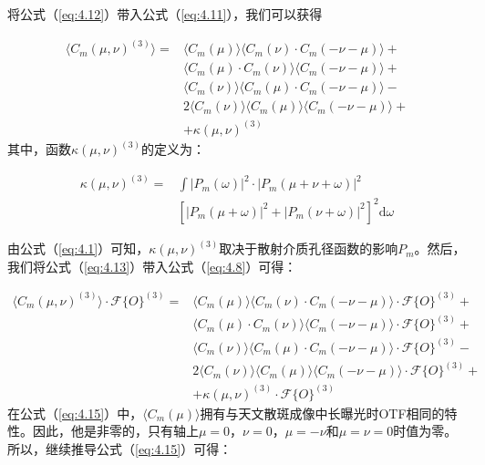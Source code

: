 将公式（\ref{eq:4.12}）带入公式（\ref{eq:4.11}），我们可以获得

\begin{equation}
\begin{aligned}
    \langle C_m(\mu,\nu)^{(3)} \rangle = &\langle C_m(\mu) \rangle \langle C_m(\nu) \cdot C_m(-\nu-\mu) \rangle + \\
		& \langle C_m(\mu)\cdot C_m(\nu) \rangle \langle C_m(-\nu-\mu) \rangle +\\
		& \langle C_m(\nu) \rangle \langle C_m(\mu) \cdot C_m(-\nu-\mu) \rangle -\\
		& 2\langle C_m(\nu) \rangle \langle C_m(\mu)\rangle \langle C_m(-\nu-\mu) \rangle +\\
		& + \kappa(\mu,\nu)^{(3)}
\end{aligned}
\label{eq:4.13}
\end{equation}其中，函数$\kappa(\mu,\nu)^{(3)}$的定义为：

\begin{equation}
\begin{aligned}
    \kappa(\mu,\nu)^{(3)} = &\int |P_m(\omega)|^2 \cdot |P_m(\mu+\nu+\omega)|^2 \\
		& \left[|P_m(\mu + \omega)|^2 + |P_m(\nu+\omega)|^2 \right]^2 \mathrm{d}{\omega}
\end{aligned}
\label{eq:4.14}
\end{equation}

由公式（\ref{eq:4.1}）可知，$\kappa(\mu,\nu)^{(3)}$取决于散射介质孔径函数的影响$P_m$。然后，我们将公式（\ref{eq:4.13}）带入公式（\ref{eq:4.8}）可得：

\begin{equation}
\begin{aligned}
    \langle C_m(\mu,\nu)^{(3)} \rangle \cdot \mathcal{F}\{ O \}^{(3)}= &\langle C_m(\mu) \rangle \langle C_m(\nu) \cdot C_m(-\nu-\mu) \rangle \cdot \mathcal{F}\{ O \}^{(3)}+ \\
		& \langle C_m(\mu)\cdot C_m(\nu) \rangle \langle C_m(-\nu-\mu) \rangle \cdot \mathcal{F}\{ O \}^{(3)}+\\
		& \langle C_m(\nu) \rangle \langle C_m(\mu) \cdot C_m(-\nu-\mu) \rangle \cdot \mathcal{F}\{ O \}^{(3)}-\\
		& 2\langle C_m(\nu) \rangle \langle C_m(\mu)\rangle \langle C_m(-\nu-\mu) \rangle \cdot \mathcal{F}\{ O \}^{(3)}+\\
		& + \kappa(\mu,\nu)^{(3)}\cdot \mathcal{F}\{ O \}^{(3)}
\end{aligned}
\label{eq:4.15}
\end{equation}
在公式（\ref{eq:4.15}）中，$\langle C_m(\mu) \rangle$拥有与天文散斑成像中长曝光时OTF相同的特性。因此，他是非零的，只有轴上$\mu = 0$，$\nu = 0$，$\mu = -\nu$和$\mu =\nu= 0$时值为零。所以，继续推导公式（\ref{eq:4.15}）可得：

